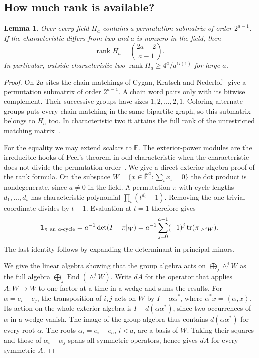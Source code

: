 \documentclass[11pt]{article}
\newtheorem{lemma}[theorem]{Lemma}
\theoremstyle{definition}
\newcommand{\F}{\mathbb F}
\newcommand{\rank}{\operatorname{rank}}
\newcommand{\one}{\mathbf{1}}
\newcommand{\olF}{\overline{\F}}
\newcommand{\angles}[1]{\left\langle #1\right\rangle}
\DeclareMathOperator{\End}{End}
\DeclareMathOperator{\tr}{tr}
\begin{document}
\subsection{How much rank is available?}

\begin{lemma}\label{lem:rank}
Over every field \(H_a\) contains a permutation submatrix of order \(2^{a-1}\). If the characteristic differs from two and \(a\) is nonzero in the field, then
\[
                     \rank H_a=\binom{2a-2}{a-1}.
\]
In particular, outside characteristic two \(\rank H_a\ge 4^a/a^{O(1)}\) for large \(a\).
\end{lemma}
\begin{proof}
On \(2a\) sites the chain matchings of Cygan, Kratsch and Nederlof~\cite[Proposition~3.3]{ckn} give a permutation submatrix of order \(2^{a-1}\). A chain word pairs only with its bitwise complement. Their successive groups have sizes \(1,2,\ldots,2,1\). Coloring alternate groups puts every chain matching in the same bipartite graph, so this submatrix belongs to \(H_a\) too. In characteristic two it attains the full rank of the unrestricted matching matrix~\cite[Theorem~3.4]{ckn}.

For the equality we may extend scalars to \(\olF\). The exterior-power modules are the irreducible hooks of Peel's theorem in odd characteristic when the characteristic does not divide the permutation order~\cite[Theorem~2]{peel-hooks}. We give a direct exterior-algebra proof of the rank formula. On the subspace \(W=\{x\in\olF^a:\sum_i x_i=0\}\) the dot product is nondegenerate, since \(a\ne0\) in the field. A permutation \(\pi\) with cycle lengths \(d_1,\ldots,d_s\) has characteristic polynomial \(\prod_i(t^{d_i}-1)\). Removing the one trivial coordinate divides by \(t-1\). Evaluation at \(t=1\) therefore gives
\begin{equation}\label{eq:trace}
 \one_{\pi\ {\rm an}\ a\text{-cycle}}
   =a^{-1}\det(I-\pi|_W)
   =a^{-1}\sum_{j=0}^{a-1}(-1)^j\tr(\pi|_{\wedge^j W}).
\end{equation}
The last identity follows by expanding the determinant in principal minors.

We give the linear algebra showing that the group algebra acts on \(\bigoplus_j\wedge^j W\) as the full algebra \(\bigoplus_j\End(\wedge^j W)\). Write \(dA\) for the operator that applies \(A:W\to W\) to one factor at a time in a wedge and sums the results. For \(\alpha=e_i-e_j\), the transposition of \(i,j\) acts on \(W\) by \(I-\alpha\alpha^*\), where \(\alpha^*x=\angles{\alpha,x}\). Its action on the whole exterior algebra is \(I-d(\alpha\alpha^*)\), since two occurrences of \(\alpha\) in a wedge vanish. The image of the group algebra thus contains \(d(\alpha\alpha^*)\) for every root \(\alpha\). The roots \(\alpha_i=e_i-e_a\), \(i<a\), are a basis of \(W\). Taking their squares and those of \(\alpha_i-\alpha_j\) spans all symmetric operators, hence gives \(dA\) for every symmetric \(A\).


\end{proof}
\end{document}
